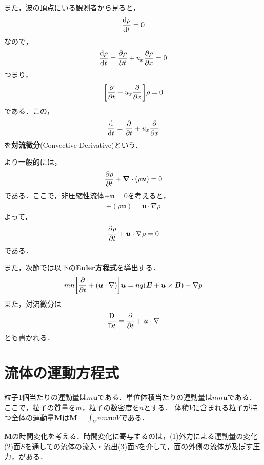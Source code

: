 \documentclass{report}
\begin{document}
    また，波の頂点にいる観測者から見ると，
    \begin{align}
      \dv{\rho}{t} = 0
    \end{align}
    なので，
    \begin{align}
      \dv{\rho}{t} = \pdv{\rho}{t} + u_x \pdv{\rho}{x} = 0
    \end{align}
    つまり，
    \begin{align}
      \qty[\pdv{t} + u_x \pdv{x}]\rho = 0
    \end{align}
    である．この，
    \begin{align}
      \dv{t} = \pdv{t} + u_x \pdv{x}
    \end{align}
    を\textbf{対流微分}(Convective Derivative)という．

    より一般的には，
    \begin{align}
      \pdv{\rho}{t} + \div(\rho \bm{u}) = 0
    \end{align}
    である．ここで，非圧縮性流体$\div \bm{u} = 0$を考えると，
    \begin{align}
      \div(\rho \bm{u}) = \bm{u} \cdot \nabla \rho
    \end{align}
    よって，
    \begin{align}
      \pdv{\rho}{t} + \bm{u} \cdot \nabla \rho = 0
    \end{align}
    である．

    また，次節では以下の\textbf{Euler方程式}を導出する．
    \begin{align}
      mn\qty[\pdv{t} + (\bm{u} \cdot \nabla)]\bm{u} = nq(\bm{E} + \bm{u} \times \bm{B}) - \nabla p
    \end{align}
    また，対流微分は
    \begin{align}
      \frac{\mathrm{D}}{\mathrm{D}t} = \pdv{t} + \bm{u} \cdot \nabla
    \end{align}
    とも書かれる．

  \section{流体の運動方程式}
    粒子1個当たりの運動量は$m\bm{u}$である．単位体積当たりの運動量は$n m \bm{u}$である．ここで，粒子の質量を$m$，粒子の数密度を$n$とする．
    体積$V$に含まれる粒子が持つ全体の運動量$\bm{M}$は$\bm{M} = \int_V n m \bm{u} \dd{V}$である．

    $\bm{M}$の時間変化を考える．時間変化に寄与するのは，(1)外力による運動量の変化(2)面$S$を通しての流体の流入・流出(3)面$S$を介して，面の外側の流体が及ぼす圧力，がある．
\end{document}
